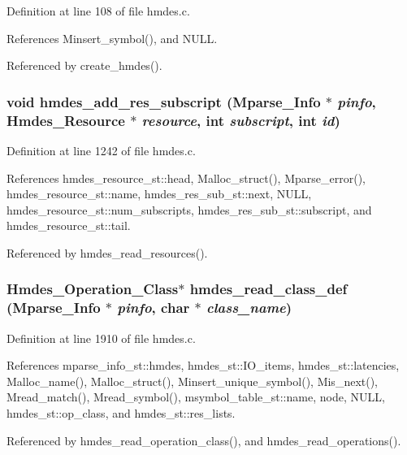 Definition at line 108 of file hmdes.c.

References Minsert\_\-symbol(), and NULL.

Referenced by create\_\-hmdes().
\subsubsection{\setlength{\rightskip}{0pt plus 5cm}void hmdes\_\-add\_\-res\_\-subscript (\bf{Mparse\_\-Info} $\ast$ {\em pinfo}, \bf{Hmdes\_\-Resource} $\ast$ {\em resource}, int {\em subscript}, int {\em id})}\label{hmdes_8c_c3ce0111eb5b22ea3eb78d74799c9512}




Definition at line 1242 of file hmdes.c.

References hmdes\_\-resource\_\-st::head, Malloc\_\-struct(), Mparse\_\-error(), hmdes\_\-resource\_\-st::name, hmdes\_\-res\_\-sub\_\-st::next, NULL, hmdes\_\-resource\_\-st::num\_\-subscripts, hmdes\_\-res\_\-sub\_\-st::subscript, and hmdes\_\-resource\_\-st::tail.

Referenced by hmdes\_\-read\_\-resources().
\subsubsection{\setlength{\rightskip}{0pt plus 5cm}\bf{Hmdes\_\-Operation\_\-Class}$\ast$ hmdes\_\-read\_\-class\_\-def (\bf{Mparse\_\-Info} $\ast$ {\em pinfo}, char $\ast$ {\em class\_\-name})}\label{hmdes_8c_6f29bb3b7b186a76438eb0c3c07bcc30}




Definition at line 1910 of file hmdes.c.

References mparse\_\-info\_\-st::hmdes, hmdes\_\-st::IO\_\-items, hmdes\_\-st::latencies, Malloc\_\-name(), Malloc\_\-struct(), Minsert\_\-unique\_\-symbol(), Mis\_\-next(), Mread\_\-match(), Mread\_\-symbol(), msymbol\_\-table\_\-st::name, node, NULL, hmdes\_\-st::op\_\-class, and hmdes\_\-st::res\_\-lists.

Referenced by hmdes\_\-read\_\-operation\_\-class(), and hmdes\_\-read\_\-operations().
